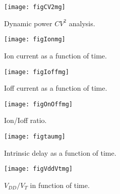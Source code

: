 \documentclass[a4paper, 12pt, twoside, openright]{report}
\begin{document}
	\begin{figure}[h]
	\centering
	\texttt{[image: figCV2mg]}
	\caption{Dynamic power $CV^{2}$ analysis.}
	\label{CV^2}
	\end{figure}

	\begin{figure}[h]
	\centering
	\texttt{[image: figIonmg]}
	\caption{Ion current as a function of time.}
	\label{}
	\end{figure}

	\begin{figure}[h]
	\centering
	\texttt{[image: figIoffmg]}
	\caption{Ioff current as a function of time.}
	\label{}
	\end{figure}

	\begin{figure}[h]
	\centering
	\texttt{[image: figOnOffmg]}
	\caption{Ion/Ioff ratio.}
	\label{Ion-Ioff}
	\end{figure}

	\begin{figure}[h]
	\centering
	\texttt{[image: figtaumg]}
	\caption{Intrinsic delay as a function of time.}
	\label{tau}
	\end{figure}

	\begin{figure}[H]
	\centering
	\texttt{[image: figVddVtmg]}
	\caption{$V_{DD}/V_{T}$ in function of time.}
	\label{}
	\end{figure}

\end{document}
